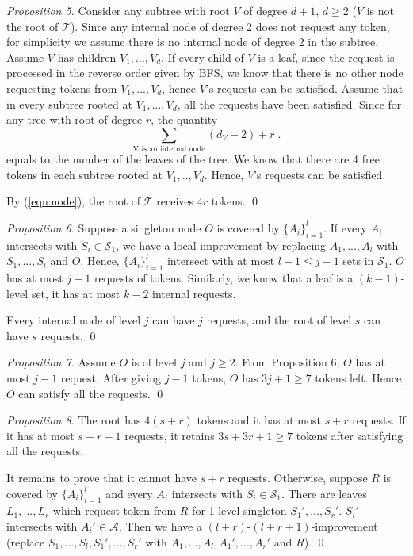 \documentclass[runningheads,a4paper]{llncs}
\numberwithin{equation}{section}
\begin{document}
\begin{proof}[Proposition 5]
Consider any subtree with root $V$ of degree $d+1$, $d\geq 2$ ($V$ is not the root of $\mathscr{T}$). Since any internal node of degree 2 does not request any token, for simplicity we assume there is no internal node of degree 2 in the subtree. Assume $V$ has children $V_1,...,V_d$. If every child of $V$ is a leaf, since the request is processed in the reverse order given by BFS, we know that there is no other node requesting tokens from $V_1,...,V_d$, hence $V$'s requests can be satisfied. Assume that in every subtree rooted at $V_1,...,V_d$, all the requests have been satisfied. Since for any tree with root of degree $r$, the quantity
\begin{equation}
\sum_{\textrm{V is an internal node}}(d_V-2)+r \; .
\label{eqn:node}
\end{equation}
equals to the number of the leaves of the tree. We know that there are 4 free tokens in each subtree rooted at $V_1,..,V_d$. Hence, $V$'s requests can be satisfied.

By (\ref{eqn:node}), the root of $\mathscr{T}$ receives $4r$ tokens. \qed
\end{proof}

\begin{proof}[Proposition 6]
Suppose a singleton node $O$ is covered by $\{A_i\}_{i=1}^l$. If every $A_i$ intersects with $S_i\in\mathscr{S}_1$, we have a local improvement by replacing $A_1,...,A_l$ with $S_1,...,S_l$ and $O$. Hence, $\{A_i\}_{i=1}^l$ intersect with at most $l-1\leq j-1$ sets in $\mathscr{S}_1$. $O$ has at most $j-1$ requests of tokens. Similarly, we know that a leaf is a $(k-1)$-level set, it has at most $k-2$ internal requests.

Every internal node of level $j$ can have $j$ requests, and the root of level $s$ can have $s$ requests. \qed
\end{proof}


\begin{proof}[Proposition 7]
Assume $O$ is of level $j$ and $j\geq 2$. From Proposition 6, $O$ has at most $j-1$ request. After giving $j-1$ tokens, $O$ has $3j+1\geq 7$ tokens left. Hence, $O$ can satisfy all the requests. \qed
\end{proof}

\begin{proof}[Proposition 8]
The root has $4(s+r)$ tokens and it has at most $s+r$ requests. If it has at most $s+r-1$ requests, it retains $3s+3r+1\geq 7$ tokens after satisfying all the requests.

It remains to prove that it cannot have $s+r$ requests. Otherwise, suppose $R$ is covered by $\{A_i\}_{i=1}^l$ and every $A_i$ intersects with $S_i\in\mathscr{S}_1$. There are leaves $L_1,...,L_r$ which request token from $R$ for 1-level singleton $S_1',...,S_r'$. $S_i'$ intersects with $A_i'\in\mathscr{A}$. Then we have a $(l+r)$-$(l+r+1)$-improvement (replace $S_1,...,S_l,S_1',...,S_r'$ with $A_1,...,A_l,A_1',...,A_r'$ and $R$). \qed
\end{proof}
\end{document}
